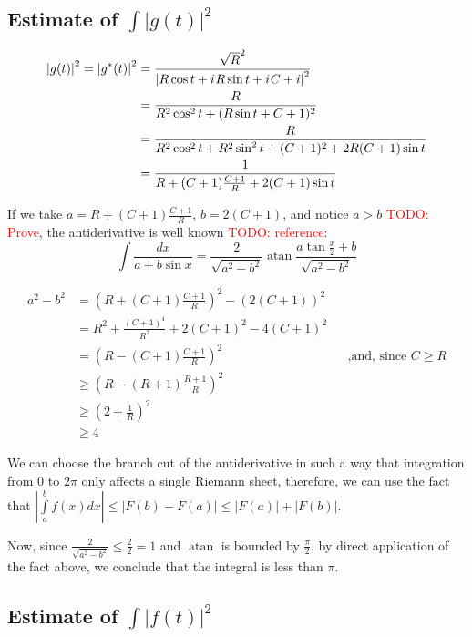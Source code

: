 \documentclass[12pt, a4paper]{article}
\newcommand{\abs}[1]{\left| #1 \right|}
\newcommand{\iu}{{i\mkern1mu}}
\newcommand{\todo}[1]{{\large \textcolor{red}{TODO: #1}}}
\DeclareMathOperator\atan{atan}
\begin{document}
\subsection{Estimate of $\int \abs{g(t)}^2$}

\begin{align*}
\abs{g(t)}^2 = \abs{g^*(t)}^2
&=   \frac{\sqrt{R}^2}{\abs{R \cos t + \iu R \sin t + \iu C + i}^2} \\
&=   \frac{R}{R^2 \cos^2 t + (R \sin t + C + 1)^2} \\
&= \frac{R}{R^2 \cos^2 t + R^2 \sin^2 t + (C + 1)^2  + 2 R (C + 1) \sin t} \\
&=   \frac{1}{R + (C + 1) \frac{C + 1}{R} + 2 (C + 1) \sin t} \\ 
\end{align*}

If we take $a = R + (C + 1) \frac{C + 1}{R}$, $b = 2 (C + 1)$, and notice $a > b$ \todo{Prove}, the antiderivative is well known \todo{reference}:
\[
\int \frac{dx}{a + b \sin x} = \frac{2}{\sqrt{a^2 - b^2}} \atan \frac{a \tan \frac{x}{2} + b}{\sqrt{a^2 - b^2}}
\]


\begin{align*}
a^2 - b^2
& =  (R + (C + 1) \frac{C + 1}{R})^2 - (2 (C + 1))^2\\
& =  R^2 + \frac{(C+1)^4}{R^2} + 2 (C+1)^2 - 4 (C + 1)^2 \\
& =  (R - (C + 1) \frac{C + 1}{R})^2 && \text{,and, since $C \ge R$} \\
&\ge (R - (R + 1) \frac{R + 1}{R})^2 \\
&\ge (2 + \frac{1}{R})^2 \\
&\ge 4
\end{align*}

We can choose the branch cut of the antiderivative in such a way that integration from $0$ to $2 \pi$ only affects a single Riemann sheet, therefore, we can use the fact that $\abs{\int\limits_a^b f(x) dx} \le \abs{F(b) - F(a)} \le \abs{F(a)} + \abs{F(b)}$.

Now, since $\frac{2}{\sqrt{a^2 - b^2}} \le \frac{2}{2} = 1$ and $\atan$ is bounded by $\frac{\pi}{2}$, by direct application of the fact above, we conclude that the integral is less than $\pi$.

\subsection{Estimate of $\int \abs{f(t)}^2$}
\end{document}
